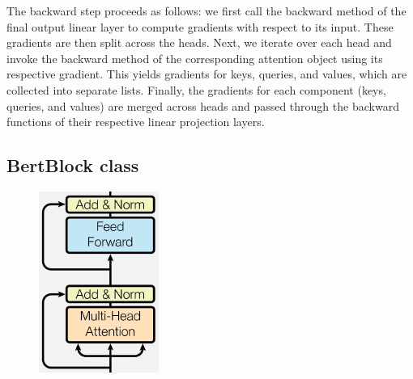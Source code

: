 \documentclass{../../../extra/aakpract/aakpract}
\begin{document}
The backward step proceeds as follows: we first call the backward method of the final output linear layer to compute gradients with respect to its input. 
These gradients are then split across the heads. 
Next, we iterate over each head and invoke the backward method of the corresponding attention object using its respective gradient. 
This yields gradients for keys, queries, and values, which are collected into separate lists. 
Finally, the gradients for each component (keys, queries, and values) are merged across heads and passed through the backward functions of their respective linear projection layers.

\newpage
\subsection{BertBlock class}

\begin{figure}
	\centering
	\includegraphics[width=\linewidth]{img/encoder_block_.pdf}
\end{figure}
\end{document}
